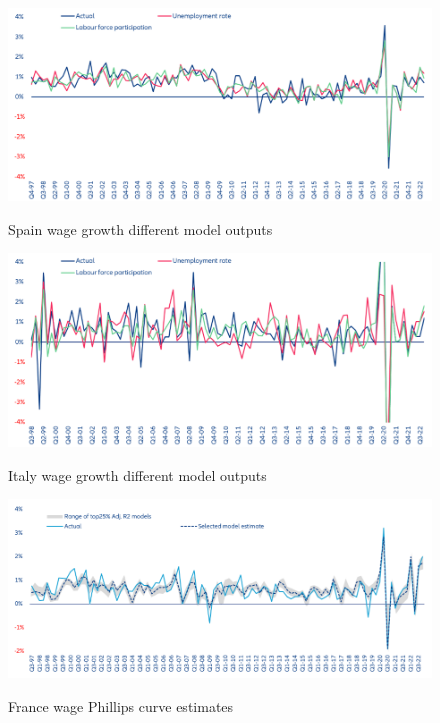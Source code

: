 \begin{figure}[H]
    \centering
    \caption{Spain wage growth different model outputs}
    \includegraphics[width=.95\textwidth]{Core/2.Labour/img/Spain output.png}
    \label{figure:sp_output}
\end{figure}

\begin{figure}[H]
    \centering
    \caption{Italy wage growth different model outputs}
    \includegraphics[width=.95\textwidth]{Core/2.Labour/img/Italy output.png}
    \label{figure:it_output}
\end{figure}

\begin{figure}[H]
    \centering
    \caption{France wage Phillips curve estimates}
    \includegraphics[width=.95\textwidth]{Core/2.Labour/img/france25.png}
    \label{figure:fr25}
\end{figure}

